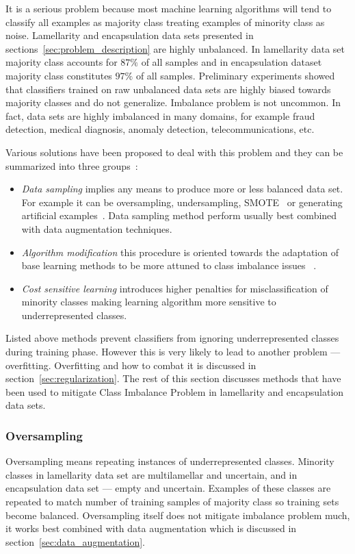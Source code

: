 \documentclass[a4paper, 11pt, table]{article}
\begin{document}
It is a serious problem because most machine learning algorithms will tend to classify all examples as majority class treating examples of minority class as noise. Lamellarity and encapsulation data sets presented in sections~\ref{sec:problem_description} are highly unbalanced. In lamellarity data set majority class accounts for $87\%$ of all samples and in encapsulation dataset majority class constitutes $97\%$ of all samples. Preliminary experiments showed that classifiers trained on raw unbalanced data sets are highly biased towards majority classes and do not generalize. Imbalance problem is not uncommon. In fact, data sets are highly imbalanced in many domains, for example fraud detection, medical diagnosis, anomaly detection, telecommunications, etc. 

Various solutions have been proposed to deal with this problem and they can be summarized into three groups~\cite{Lopez2013113}:

\begin{itemize}

\item \textit{Data sampling} implies any means to produce more or less balanced data set. For example it can be oversampling, undersampling, SMOTE~\cite{smote_chawla} or generating artificial examples~\cite{ishaq_synthetic}. Data sampling method perform usually best combined with data augmentation techniques.

\item \textit{Algorithm modification} this procedure is oriented towards the adaptation of base learning methods to be more attuned to class imbalance issues ~\cite{Zadrozny:2001:LMD:502512.502540}.

\item \textit{Cost sensitive learning} introduces higher penalties for misclassification of minority classes making learning algorithm more sensitive to underrepresented classes. 

\end{itemize}

Listed above methods prevent classifiers from ignoring underrepresented classes during training phase. However this is very likely to lead to another problem --- overfitting. Overfitting and how to combat it is discussed in section~\ref{sec:regularization}. The rest of this section discusses methods that have been used to mitigate Class Imbalance Problem in lamellarity and encapsulation data sets. 


\subsubsection{Oversampling}
Oversampling means repeating instances of underrepresented classes. Minority classes in lamellarity data set are multilamellar and uncertain, and in encapsulation data set --- empty and uncertain. Examples of these classes are repeated to match number of training samples of majority class so training sets become balanced. Oversampling itself does not mitigate imbalance problem much, it works best combined with data augmentation which is discussed in section~\ref{sec:data_augmentation}.
\end{document}
